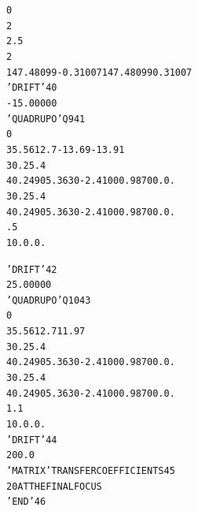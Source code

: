 \begin{tiny}
\begin{alltt}
     0                                                                          
    2                                                       
     2.5                                                                        
    2                                                       
    147.48099   -0.31007  147.48099    0.31007                                  
   'DRIFT'                                                                40
   -15.00000                                                                    
   'QUADRUPO'                            Q9                               41
   0                                                        
    35.56  12.7  -13.69  -13.91                                                 
    30.  25.4                                                                   
    4    0.2490   5.3630  -2.4100   0.9870   0.   0.                            
    30.  25.4                                                                   
    4    0.2490   5.3630  -2.4100   0.9870   0.   0.                            
     .5                                                                         
    1  0. 0. 0.                                                                 
\end{alltt}
\onecolumn
\clearpage
\begin{alltt}
   'DRIFT'                                                                42
     25.00000                                                                   
   'QUADRUPO'                            Q10                              43
   0                                                        
     35.56  12.7  11.97                                                         
    30.  25.4                                                                   
    4    0.2490   5.3630  -2.4100   0.9870   0.   0.                            
    30.  25.4                                                                   
    4    0.2490   5.3630  -2.4100   0.9870   0.   0.                            
     1.1                                                                        
    1  0. 0. 0.                                                                 
   'DRIFT'                                                                44
    200.0                                                                       
   'MATRIX'                              TRANSFER  COEFFICIENTS           45
   2 0                                   AT  THE  FINAL  FOCUS                  
   'END'                                                                  46
\end{alltt}


\end{tiny}
